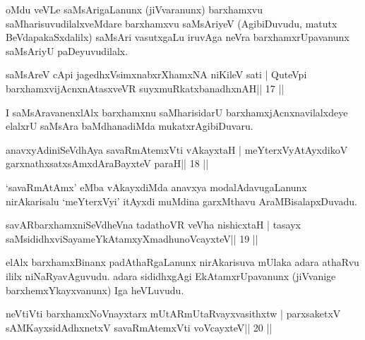 \begin{artha}
oMdu veVLe saMsArigaLanunx (jiVvaranunx) barxhamxvu saMharisuvudilalxveMdare barxhamxvu saMsAriyeV (AgibiDuvudu, matutx BeVdapakaSxdalilx) saMsAri vasutxgaLu iruvAga neVra barxhamxrUpavanunx saMsAriyU paDeyuvudilalx.
\end{artha}

\begin{shl}
saMsAreV cApi jagedhxV\s simxnabxrXhamxNA niKileV sati |
QuteV\s pi barxhamxvijAcnxnAtasxveVR suyxmuRkatxbanadhxnAH\hfill || 17 ||
\end{shl}

\begin{artha}
I saMsAravanenxlAlx barxhamxnu saMharisidarU barxhamxjAcnxnavilalxdeye elalxrU saMsAra baMdhanadiMda mukatxrAgibiDuvaru.
\end{artha}


\begin{shl}
anavxyAdiniSeVdhAya savaRmAtemxVti vAkayxtaH |
meYterxVyAtAyxdikoV garxnathxsatxsAmxdAraBayxteV paraH\hfill || 18 ||
\end{shl}

\begin{artha}
`savaRmAtAmx' eMba vAkayxdiMda anavxya modalAdavugaLanunx   nirAkarisalu `meYterxVyi' itAyxdi muMdina garxMthavu   AraMBisalapxDuvadu.
\end{artha}


\begin{shl}
savARbarxhamxniSeVdheVna tadathoVR veVha nishicxtaH |
tasayx saMsididhxviSayameYkAtamxyXmadhunoVcayxteV\hfill || 19 ||
\end{shl}

\begin{artha}
elAlx barxhamxBinanx padAthaRgaLanunx nirAkarisuva mUlaka adara athaRvu ililx niNaRyavAguvudu. adara sididhxgAgi EkAtamxrUpavanunx (jiVvanige barxhemxYkayxvanunx) Iga heVLuvudu.
\end{artha}


\begin{shl}
neVtiVti barxhamxNoV\s nayxtarx mUtARmUtaRvayxvasithxtw |
parxsaketxV sAMKayxsidAdhxnetxV savaRmAtemxVti voVcayxteV\hfill || 20 ||
\end{shl}

